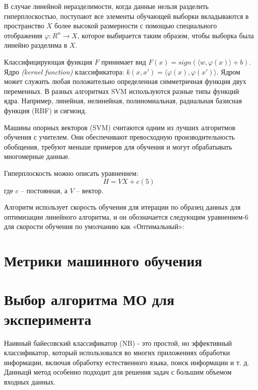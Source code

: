 В случае линейной неразделимости, когда данные нельзя разделить гиперплоскостью, поступают 
все элементы обучающей выборки вкладываются в пространство $X$ более высокой размерности с 
помощью специального отображения $\varphi : R^n \rightarrow X$, которое выбирается таким образом, 
чтобы выборка была линейно разделима в $X$.

Классифицирующая функция $F$ принимает вид $F(x)=sign(\langle w, \varphi (x) \rangle + b)$. 
Ядро \emph{(kernel function)} классификатора: $k(x, x') = \langle \varphi (x), \varphi (x') \rangle $.
Ядром может служить любая положительно определенная симметричная функция двух переменных. 
В разных алгоритмах SVM используются разные типы функций ядра. Например, линейная, нелинейная, 
полиномиальная, радиальная базисная функция (RBF) и сигмоид. \cite{SVM}

Машины опорных векторов (SVM) считаются одним из лучших алгоритмов обучения 
с учителем. Они обеспечивают превосходную производительность обобщения, требуют 
меньше примеров для обучения и могут обрабатывать многомерные данные. \cite{scikit}

Гиперплоскость можно описать уравнением:
\begin{equation}\label{eq5}
    H = VX + c (5)
\end{equation}
где $c$ -- постоянная, а $V$ -- вектор.

Алгоритм использует скорость обучения для итерации по образец данных для 
оптимизации линейного алгоритма, и он обозначается следующим уравнением-6 
для скорости обучения по умолчанию как «Оптимальный»:

\section{Метрики машинного обучения}


\section{Выбор алгоритма МО для эксперимента}
Наивный байесовский классификатор (NB) - это простой, но эффективный классификатор, 
который использовался во многих приложениях обработки информации, включая обработку 
естественного языка, поиск информации и т. д. Данныцй метод особенно подходит для решения задач 
с большим объемом входных данных.

